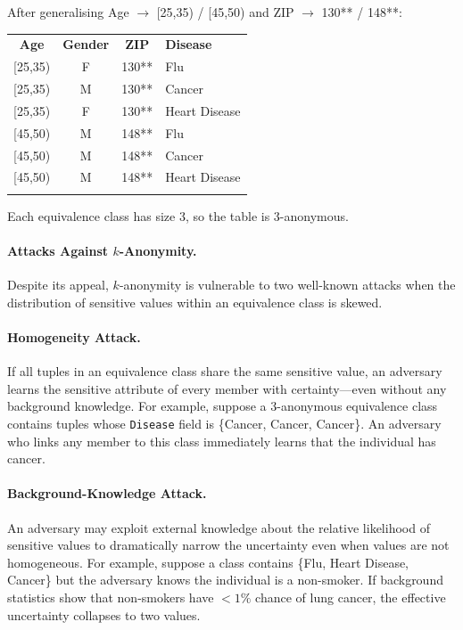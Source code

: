 After generalising Age $\to$ [25,35) / [45,50) and ZIP $\to$ 130** / 148**:

\begin{center}
\begin{tabular}{cccp{3cm}}
\hline\noalign{\smallskip}
\textbf{Age} & \textbf{Gender} & \textbf{ZIP} & \textbf{Disease}\\
\noalign{\smallskip}\svhline\noalign{\smallskip}
{[}25,35) & F & 130** & Flu\\
{[}25,35) & M & 130** & Cancer\\
{[}25,35) & F & 130** & Heart Disease\\
{[}45,50) & M & 148** & Flu\\
{[}45,50) & M & 148** & Cancer\\
{[}45,50) & M & 148** & Heart Disease\\
\noalign{\smallskip}\hline\noalign{\smallskip}
\end{tabular}
\end{center}

Each equivalence class has size 3, so the table is 3-anonymous.

\paragraph{Attacks Against $k$-Anonymity.}

Despite its appeal, $k$-anonymity is vulnerable to two well-known attacks when the distribution of sensitive values within an equivalence class is skewed.

\paragraph{Homogeneity Attack.}
If all tuples in an equivalence class share the same sensitive value, an adversary learns the sensitive attribute of every member with certainty---even without any background knowledge. For example, suppose a 3-anonymous equivalence class contains tuples whose \texttt{Disease} field is \{Cancer, Cancer, Cancer\}. An adversary who links any member to this class immediately learns that the individual has cancer.

\paragraph{Background-Knowledge Attack.}
An adversary may exploit external knowledge about the relative likelihood of sensitive values to dramatically narrow the uncertainty even when values are not homogeneous. For example, suppose a class contains \{Flu, Heart Disease, Cancer\} but the adversary knows the individual is a non-smoker. If background statistics show that non-smokers have $<1\%$ chance of lung cancer, the effective uncertainty collapses to two values.

